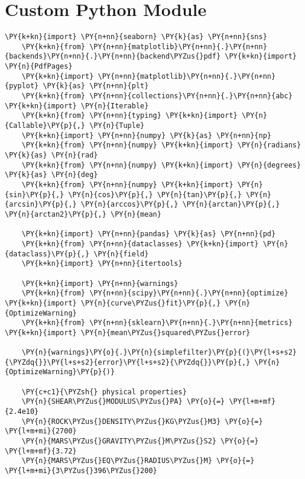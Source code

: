 \chapter{Custom Python Module}\label{app:code}

\begin{tcolorbox}[breakable, size=fbox, boxrule=1pt, pad at break*=1mm,colback=cellbackground, colframe=cellborder]
    \begin{Verbatim}[commandchars=\\\{\}]
    \PY{k+kn}{import} \PY{n+nn}{seaborn} \PY{k}{as} \PY{n+nn}{sns}
    \PY{k+kn}{from} \PY{n+nn}{matplotlib}\PY{n+nn}{.}\PY{n+nn}{backends}\PY{n+nn}{.}\PY{n+nn}{backend\PYZus{}pdf} \PY{k+kn}{import} \PY{n}{PdfPages}
    \PY{k+kn}{import} \PY{n+nn}{matplotlib}\PY{n+nn}{.}\PY{n+nn}{pyplot} \PY{k}{as} \PY{n+nn}{plt}
    \PY{k+kn}{from} \PY{n+nn}{collections}\PY{n+nn}{.}\PY{n+nn}{abc} \PY{k+kn}{import} \PY{n}{Iterable}
    \PY{k+kn}{from} \PY{n+nn}{typing} \PY{k+kn}{import} \PY{n}{Callable}\PY{p}{,} \PY{n}{Tuple}
    \PY{k+kn}{import} \PY{n+nn}{numpy} \PY{k}{as} \PY{n+nn}{np}
    \PY{k+kn}{from} \PY{n+nn}{numpy} \PY{k+kn}{import} \PY{n}{radians} \PY{k}{as} \PY{n}{rad}
    \PY{k+kn}{from} \PY{n+nn}{numpy} \PY{k+kn}{import} \PY{n}{degrees} \PY{k}{as} \PY{n}{deg}
    \PY{k+kn}{from} \PY{n+nn}{numpy} \PY{k+kn}{import} \PY{n}{sin}\PY{p}{,} \PY{n}{cos}\PY{p}{,} \PY{n}{tan}\PY{p}{,} \PY{n}{arcsin}\PY{p}{,} \PY{n}{arccos}\PY{p}{,} \PY{n}{arctan}\PY{p}{,} \PY{n}{arctan2}\PY{p}{,} \PY{n}{mean}
    
    \PY{k+kn}{import} \PY{n+nn}{pandas} \PY{k}{as} \PY{n+nn}{pd}
    \PY{k+kn}{from} \PY{n+nn}{dataclasses} \PY{k+kn}{import} \PY{n}{dataclass}\PY{p}{,} \PY{n}{field}
    \PY{k+kn}{import} \PY{n+nn}{itertools}
    
    \PY{k+kn}{import} \PY{n+nn}{warnings}
    \PY{k+kn}{from} \PY{n+nn}{scipy}\PY{n+nn}{.}\PY{n+nn}{optimize} \PY{k+kn}{import} \PY{n}{curve\PYZus{}fit}\PY{p}{,} \PY{n}{OptimizeWarning}
    \PY{k+kn}{from} \PY{n+nn}{sklearn}\PY{n+nn}{.}\PY{n+nn}{metrics} \PY{k+kn}{import} \PY{n}{mean\PYZus{}squared\PYZus{}error}
    
    \PY{n}{warnings}\PY{o}{.}\PY{n}{simplefilter}\PY{p}{(}\PY{l+s+s2}{\PYZdq{}}\PY{l+s+s2}{error}\PY{l+s+s2}{\PYZdq{}}\PY{p}{,} \PY{n}{OptimizeWarning}\PY{p}{)}
    
    \PY{c+c1}{\PYZsh{} physical properties}
    \PY{n}{SHEAR\PYZus{}MODULUS\PYZus{}PA} \PY{o}{=} \PY{l+m+mf}{2.4e10}
    \PY{n}{ROCK\PYZus{}DENSITY\PYZus{}KG\PYZus{}M3} \PY{o}{=} \PY{l+m+mi}{2700}
    \PY{n}{MARS\PYZus{}GRAVITY\PYZus{}M\PYZus{}S2} \PY{o}{=} \PY{l+m+mf}{3.72}
    \PY{n}{MARS\PYZus{}EQ\PYZus{}RADIUS\PYZus{}M} \PY{o}{=} \PY{l+m+mi}{3\PYZus{}396\PYZus{}200}
    

\end{Verbatim}
\end{tcolorbox}
